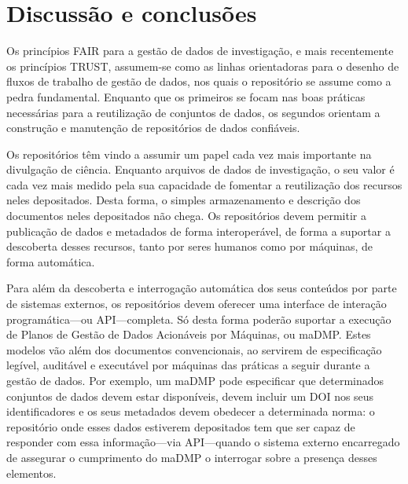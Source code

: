 \documentclass[sigconf,nonacm]{acmart}
\begin{document}


\section{Discussão e conclusões} %
\label{sec:discussao_e_conclusoes}



Os princípios FAIR para a gestão de dados de investigação, e mais recentemente os princípios TRUST, assumem-se como as linhas orientadoras para o desenho de fluxos de trabalho de gestão de dados, nos quais o repositório se assume como a pedra fundamental. Enquanto que os primeiros se focam nas boas práticas necessárias para a reutilização de conjuntos de dados, os segundos orientam a construção e manutenção de repositórios de dados confiáveis.

Os repositórios têm vindo a assumir um papel cada vez mais importante na divulgação de ciência. Enquanto arquivos de dados de investigação, o seu valor é cada vez mais medido pela sua capacidade de fomentar a reutilização dos recursos neles depositados. Desta forma, o simples armazenamento e descrição dos documentos neles depositados não chega. Os repositórios devem permitir a publicação de dados e metadados de forma interoperável, de forma a suportar a descoberta desses recursos, tanto por seres humanos como por máquinas, de forma automática.

Para além da descoberta e interrogação automática dos seus conteúdos por parte de sistemas externos, os repositórios devem oferecer uma interface de interação programática---ou API---completa. Só desta forma poderão suportar a execução de Planos de Gestão de Dados Acionáveis por Máquinas, ou maDMP. Estes modelos vão além dos documentos convencionais, ao servirem de especificação legível, auditável e executável por máquinas das práticas a seguir durante a gestão de dados. Por exemplo, um maDMP pode especificar que determinados conjuntos de dados devem estar disponíveis, devem incluir um DOI nos seus identificadores e os seus metadados devem obedecer a determinada norma: o repositório onde esses dados estiverem depositados tem que ser capaz de responder com essa informação---via API---quando o sistema externo encarregado de assegurar o cumprimento do maDMP o interrogar sobre a presença desses elementos.
\end{document}

